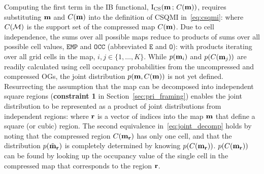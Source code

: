 Computing the first term in the IB functional, $\text{I}_{\text{CS}}(\mathbf{m}\,
;\, C(\mathbf{m}))$, requires substituting
$\mathbf{m}$ and $C(\mathbf{m})$ into the definition of CSQMI
in~\eqref{eq:csqmi}:
%
%
where $C(\mathcal{M})$ is the support set of the compressed map $C(\mathbf{m})$.
Due to cell independence, the sums over all possible maps reduce to products
of sums over all possible cell values, $\texttt{EMP}$ and $\texttt{OCC}$
(abbreviated $\texttt{E}$ and $\texttt{O}$):
%
%
with products iterating over all grid cells in the map, $i, j \in \{1,\dots,K\}$.
While $p(\mathbf{m}_{i})$ and $p(C(\mathbf{m}_{j}))$ are readily calculated using cell
occupancy probabilities from the uncompressed and compressed OGs, the joint distribution
$p(\mathbf{m}, C(\mathbf{m}))$ is not yet defined. Resurrecting the assumption that
the map can be decomposed into independent square regions
({\bf constraint 1} in Section~\ref{sec:pri_framing}) enables
the joint distribution to be represented as a product of joint distributions from independent
regions:
%
%
where $\mathbf{r}$ is a vector of indices into the map $\mathbf{m}$ that define a
square (or cubic) region. The second equivalence in~\eqref{eq:joint_decomp} holds
by noting that the compressed region $C(\mathbf{m}_{\mathbf{r}})$ has only one cell, and
that the distribution $p(\tilde{\mathbf{m}}_{\mathbf{r}})$ is completely determined by
knowing $p(C(\mathbf{m}_{\mathbf{r}}))$. $p(C(\mathbf{m}_{\mathbf{r}}))$ can be found by looking up the occupancy
value of the single cell in the compressed map that corresponds to the region $\mathbf{r}$.

